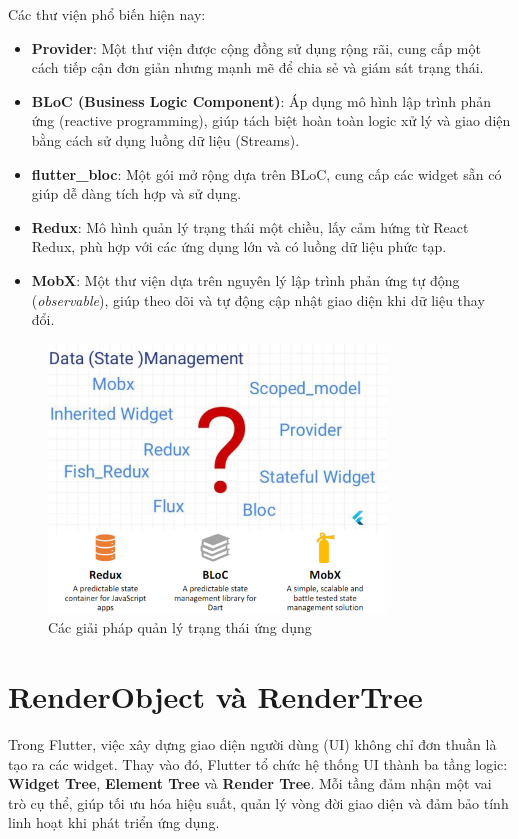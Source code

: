 \documentclass[../DoAn.tex]{subfiles}
\numberwithin{figure}{chapter}
\begin{document}
Các thư viện phổ biến hiện nay:

\begin{itemize}
    \item \textbf{Provider}: Một thư viện được cộng đồng sử dụng rộng rãi, cung cấp một cách tiếp cận đơn giản nhưng mạnh mẽ để chia sẻ và giám sát trạng thái.
    \item \textbf{BLoC (Business Logic Component)}: Áp dụng mô hình lập trình phản ứng (reactive programming), giúp tách biệt hoàn toàn logic xử lý và giao diện bằng cách sử dụng luồng dữ liệu (Streams).
    \item \textbf{flutter\_bloc}: Một gói mở rộng dựa trên BLoC, cung cấp các widget sẵn có giúp dễ dàng tích hợp và sử dụng.
    \item \textbf{Redux}: Mô hình quản lý trạng thái một chiều, lấy cảm hứng từ React Redux, phù hợp với các ứng dụng lớn và có luồng dữ liệu phức tạp.
    \item \textbf{MobX}: Một thư viện dựa trên nguyên lý lập trình phản ứng tự động (\textit{observable}), giúp theo dõi và tự động cập nhật giao diện khi dữ liệu thay đổi.
\end{itemize}

\begin{figure}[H]
    \centering
    \includegraphics[width=0.8\textwidth]{Hinhve/Chuong5/statemanagement.png}
    \caption{Các giải pháp quản lý trạng thái ứng dụng}
    \label{fig:statemanagement}
\end{figure}

\section{RenderObject và RenderTree}
Trong Flutter, việc xây dựng giao diện người dùng (UI) không chỉ đơn thuần là tạo ra các widget. Thay vào đó, Flutter tổ chức hệ thống UI thành ba tầng logic: \textbf{Widget Tree}, \textbf{Element Tree} và \textbf{Render Tree}. Mỗi tầng đảm nhận một vai trò cụ thể, giúp tối ưu hóa hiệu suất, quản lý vòng đời giao diện và đảm bảo tính linh hoạt khi phát triển ứng dụng.
\end{document}
